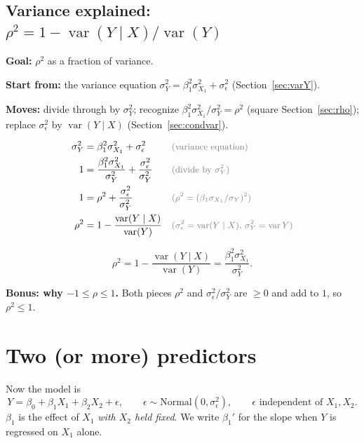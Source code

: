 \documentclass[11pt]{article}
\newcommand{\Var}{\operatorname{var}}
\newcommand{\given}{\mid}
\newcommand{\Norm}{\text{Normal}}
\newcommand{\why}[1]{&&\text{\small\color{gray}(#1)}}
\newcommand{\goal}[1]{\textbf{Goal:} #1\par}
\newcommand{\start}[1]{\textbf{Start from:} #1\par}
\newcommand{\moves}[1]{\textbf{Moves:} #1\par}
\begin{document}
\subsection{Variance explained: $\rho^2=1-\Var(Y\given X)/\Var(Y)$}\label{sec:rho2}
\begin{methodbox}
\goal{$\rho^2$ as a fraction of variance.}
\start{the variance equation $\sigma_Y^2=\beta_1^2\sigma_{X_1}^2+\sigma_\epsilon^2$ (Section~\ref{sec:varY}).}
\moves{divide through by $\sigma_Y^2$; recognize $\beta_1^2\sigma_{X_1}^2/\sigma_Y^2=\rho^2$ (square Section~\ref{sec:rho}); replace
$\sigma_\epsilon^2$ by $\Var(Y\given X)$ (Section~\ref{sec:condvar}).}
\end{methodbox}
\begin{align*}
\sigma_Y^2&=\beta_1^2\sigma_{X_1}^2+\sigma_\epsilon^2 \why{variance equation}\\
1&=\frac{\beta_1^2\sigma_{X_1}^2}{\sigma_Y^2}+\frac{\sigma_\epsilon^2}{\sigma_Y^2} \why{divide by $\sigma_Y^2$}\\
1&=\rho^2+\frac{\sigma_\epsilon^2}{\sigma_Y^2} \why{$\rho^2=(\beta_1\sigma_{X_1}/\sigma_Y)^2$}\\
\rho^2&=1-\frac{\Var(Y\given X)}{\Var(Y)} \why{$\sigma_\epsilon^2=\Var(Y\given X)$, $\sigma_Y^2=\Var Y$}
\end{align*}
\begin{keybox}
\[\rho^2=1-\frac{\Var(Y\given X)}{\Var(Y)}=\frac{\beta_1^2\sigma_{X_1}^2}{\sigma_Y^2}.\]
\end{keybox}
\textbf{Bonus: why $-1\le\rho\le1$.} Both pieces $\rho^2$ and $\sigma_\epsilon^2/\sigma_Y^2$ are $\ge0$ and add to $1$, so $\rho^2\le1$.

\clearpage
\section{Two (or more) predictors}\label{sec:twopred}
Now the model is
\[
Y=\beta_0+\beta_1X_1+\beta_2X_2+\epsilon,\qquad\epsilon\sim\Norm(0,\sigma_\epsilon^2),\qquad\epsilon\text{ independent of }X_1,X_2 .
\]
$\beta_1$ is the effect of $X_1$ \emph{with $X_2$ held fixed}. We write $\beta_1'$ for the slope when $Y$ is regressed on $X_1$ alone.
\end{document}
